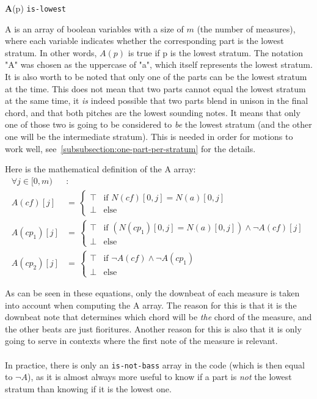 \vspace{.5cm} \noindent \textbf{A}(p) \hspace{.cm} \texttt{is-lowest} \label{is-lowest}

A is an array of boolean variables with a size of $m$ (the number of measures), where each variable indicates whether the corresponding part is the lowest stratum. In other words, $A(p)$ is true if p is the lowest stratum. The notation "A" was chosen as the uppercase of "a", which itself represents the lowest stratum. 
It is also worth to be noted that only one of the parts can be the lowest stratum at the time. This does not mean that two parts cannot equal the lowest stratum at the same time, it \textit{is} indeed possible that two parts blend in unison in the final chord, and that both pitches are the lowest sounding notes. It means that only one of those two is going to be considered to \textit{be} the lowest stratum (and the other one will be the intermediate stratum). This is needed in order for motions to work well, see~\ref{subsubsection:one-part-per-stratum} for the details.

Here is the mathematical definition of the A array:
\begin{equation}
\begin{aligned}
\forall j \in [0, m)& \colon  \\
A(\mathit{cf})[j] &= \,  
\begin{cases}
    \top & \text{if } N(cf)[0,j] = N(a)[0,j] \\
    \bot & \text{else }
\end{cases}\\
A(cp_1)[j] &= \,  
\begin{cases}
    \top & \text{if } (N(cp_1)[0,j] = N(a)[0,j]) \land \neg A(\mathit{cf})[j] \\
    \bot & \text{else }
\end{cases}\\
A(cp_2)[j] &= \,  
\begin{cases}
    \top & \text{if } \neg A(\mathit{cf}) \land \neg A(cp_1)\\
    \bot & \text{else }
\end{cases}
\end{aligned}
\end{equation}

As can be seen in these equations, only the downbeat of each measure is taken into account when computing the A array. The reason for this is that it is the downbeat note that determines which chord will be \textit{the} chord of the measure, and the other beats are just fioritures. Another reason for this is also that it is only going to serve in contexts where the first note of the measure is relevant.

\paragraph{}
In practice, there is only an \texttt{is-not-bass} array in the code (which is then equal to $\neg A$), as it is almost always more useful to know if a part is \textit{not} the lowest stratum than knowing if it is the lowest one. 

